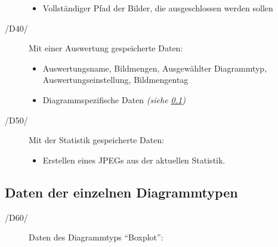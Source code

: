 \begin{description}
\begin{itemize}
		\item Vollständiger Pfad der Bilder, die ausgeschlossen werden sollen
	
	\end{itemize}
	
	\item[/D40/] Mit einer Auswertung gespeicherte Daten:
	
	\begin{itemize}
		
		\item Auswertungsname, Bildmengen, Ausgewählter Diagrammtyp, Auswertungseinstellung, Bildmengentag
		
		\item Diagrammspezifische Daten \itshape{(siehe \ref{subsec:daten-diagrammtypen})}
	
	\end{itemize}
		
	\item[/D50/] Mit der Statistik gespeicherte Daten:
	
	\begin{itemize}
	
		\item Erstellen eines JPEGs aus der aktuellen Statistik.
	
	\end{itemize}

\end{description}

\subsection{Daten der einzelnen Diagrammtypen}

\label{subsec:daten-diagrammtypen}

\begin{description}

	\item[/D60/] Daten des Diagrammtyps "`Boxplot"':

\end{description}